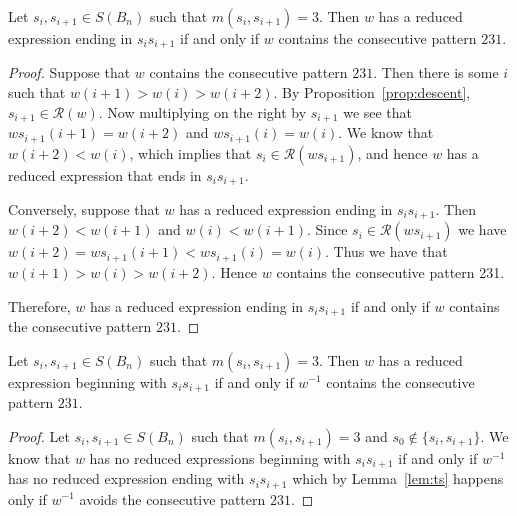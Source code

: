 \begin{lemma}\label{lem:ts}
Let $s_i,s_{i+1} \in S(B_n)$ such that $m(s_i,s_{i+1})=3$. Then $w$ has a reduced expression ending in $s_is_{i+1}$ if and only if $w$ contains the consecutive pattern $231$.
\begin{proof}	
	Suppose that $w$ contains the consecutive pattern $231$. Then there is some $i$ such that $w(i+1)>w(i)>w(i+2)$. By Proposition~\ref{prop:descent}, $s_{i+1} \in \mathcal{R}(w)$. Now multiplying on the right by $s_{i+1}$ we see that $ws_{i+1}(i+1)=w(i+2)$ and $ws_{i+1}(i)=w(i)$. We know that $w(i+2)<w(i)$, which implies that $s_i \in \mathcal{R}(ws_{i+1})$, and hence $w$ has a reduced expression that ends in $s_is_{i+1}$.
	
	 Conversely, suppose that $w$ has a reduced expression ending in $s_is_{i+1}$. Then $w(i+2)<w(i+1)$ and $w(i)<w(i+1)$. Since $s_i \in \mathcal{R}(ws_{i+1})$ we have $w(i+2)=ws_{i+1}(i+1)<ws_{i+1}(i)=w(i)$. Thus we have that $w(i+1) > w(i) > w(i+2)$. Hence $w$ contains the consecutive pattern 231.
	
	Therefore, $w$ has a reduced expression ending in $s_is_{i+1}$ if and only if $w$ contains the consecutive pattern $231$.
\end{proof}	
\end{lemma}

\begin{corollary}\label{lem:endswithst}
	Let $s_i,s_{i+1} \in S(B_n)$ such that $m(s_i,s_{i+1})=3$. Then $w$ has a reduced expression beginning with $s_is_{i+1}$ if and only if $w^{-1}$ contains the consecutive pattern $231$.
	\begin{proof}
		Let $s_i,s_{i+1} \in S(B_n)$ such that $m(s_i,s_{i+1})=3$ and $s_0 \notin\{s_i,s_{i+1}\}$. We know that $w$ has no reduced expressions beginning with $s_is_{i+1}$ if and only if $w^{-1}$ has no reduced expression ending with $s_is_{i+1}$ which by Lemma~\ref{lem:ts} happens only if $w^{-1}$ avoids the consecutive pattern $231$.
	\end{proof}
\end{corollary}

